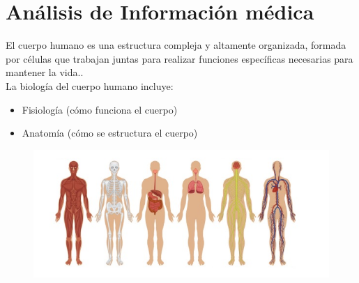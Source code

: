 \section{Análisis de Información médica}
El cuerpo humano es una estructura compleja y altamente organizada, formada por células que trabajan juntas para realizar funciones específicas necesarias para mantener 
la vida.\cite{web10}.\\
La biología del cuerpo humano incluye:\\
\begin{itemize}
  \item Fisiología (cómo funciona el cuerpo)
  \item Anatomía (cómo se estructura el cuerpo)
  \end{itemize}
\begin{figure}[H]
	\begin{center}
 		\includegraphics[width = .5\textwidth]{source/images/image22.png}
	\end{center} 
\end{figure}

